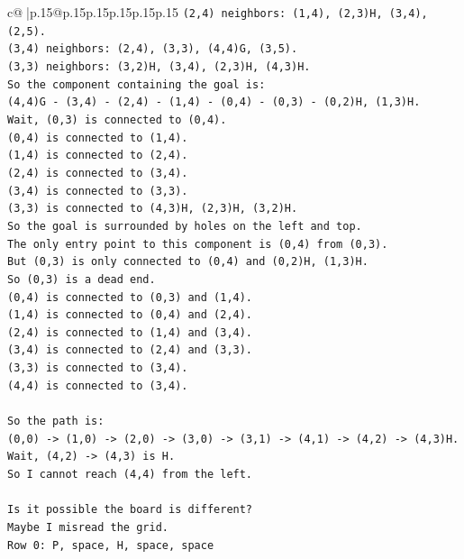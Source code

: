 \documentclass{article}
\begin{document}
{\begin{supertabular}{c@{$\;$}|p{.15\linewidth}@{}p{.15\linewidth}p{.15\linewidth}p{.15\linewidth}p{.15\linewidth}p{.15\linewidth}}
{{{\texttt{(2,4) neighbors: (1,4), (2,3)H, (3,4), (2,5).} \\
\texttt{(3,4) neighbors: (2,4), (3,3), (4,4)G, (3,5).} \\
\texttt{(3,3) neighbors: (3,2)H, (3,4), (2,3)H, (4,3)H.} \\
\texttt{So the component containing the goal is:} \\
\texttt{(4,4)G {-} (3,4) {-} (2,4) {-} (1,4) {-} (0,4) {-} (0,3) {-} (0,2)H, (1,3)H.} \\
\texttt{Wait, (0,3) is connected to (0,4).} \\
\texttt{(0,4) is connected to (1,4).} \\
\texttt{(1,4) is connected to (2,4).} \\
\texttt{(2,4) is connected to (3,4).} \\
\texttt{(3,4) is connected to (3,3).} \\
\texttt{(3,3) is connected to (4,3)H, (2,3)H, (3,2)H.} \\
\texttt{So the goal is surrounded by holes on the left and top.} \\
\texttt{The only entry point to this component is (0,4) from (0,3).} \\
\texttt{But (0,3) is only connected to (0,4) and (0,2)H, (1,3)H.} \\
\texttt{So (0,3) is a dead end.} \\
\texttt{(0,4) is connected to (0,3) and (1,4).} \\
\texttt{(1,4) is connected to (0,4) and (2,4).} \\
\texttt{(2,4) is connected to (1,4) and (3,4).} \\
\texttt{(3,4) is connected to (2,4) and (3,3).} \\
\texttt{(3,3) is connected to (3,4).} \\
\texttt{(4,4) is connected to (3,4).} \\
\\ 
\texttt{So the path is:} \\
\texttt{(0,0) {-}> (1,0) {-}> (2,0) {-}> (3,0) {-}> (3,1) {-}> (4,1) {-}> (4,2) {-}> (4,3)H.} \\
\texttt{Wait, (4,2) {-}> (4,3) is H.} \\
\texttt{So I cannot reach (4,4) from the left.} \\
\\ 
\texttt{Is it possible the board is different?} \\
\texttt{Maybe I misread the grid.} \\
\texttt{Row 0: P, space, H, space, space} \\
}}}
\end{supertabular}}
\end{document}
